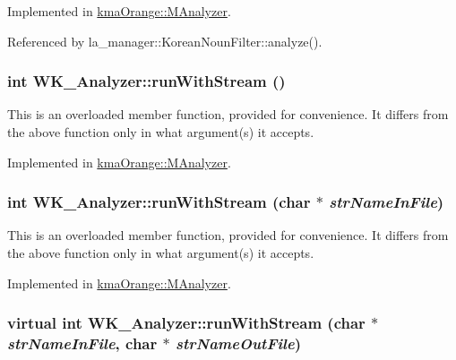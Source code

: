 Implemented in \hyperlink{classkmaOrange_1_1MAnalyzer_eff1127145ad2c8fb8e3e575d8ad1984}{kmaOrange::MAnalyzer}.

Referenced by la\_\-manager::KoreanNounFilter::analyze().\hypertarget{classWK__Analyzer_558f318419f56ffefaa2ac6027e2c12a}{
\subsubsection[{runWithStream}]{\setlength{\rightskip}{0pt plus 5cm}int WK\_\-Analyzer::runWithStream ()}}
\label{classWK__Analyzer_558f318419f56ffefaa2ac6027e2c12a}


This is an overloaded member function, provided for convenience. It differs from the above function only in what argument(s) it accepts. 

Implemented in \hyperlink{classkmaOrange_1_1MAnalyzer_906a4e70c747d3856b28e8c09fdb6a21}{kmaOrange::MAnalyzer}.\hypertarget{classWK__Analyzer_baf49aac1b32b7517c51c8cae3cf88b2}{
\subsubsection[{runWithStream}]{\setlength{\rightskip}{0pt plus 5cm}int WK\_\-Analyzer::runWithStream (char $\ast$ {\em strNameInFile})}}
\label{classWK__Analyzer_baf49aac1b32b7517c51c8cae3cf88b2}


This is an overloaded member function, provided for convenience. It differs from the above function only in what argument(s) it accepts. 

Implemented in \hyperlink{classkmaOrange_1_1MAnalyzer_6ca0018302292c83398c0c63d86616c3}{kmaOrange::MAnalyzer}.\hypertarget{classWK__Analyzer_a5e90adc6d240fcee91c41cf61bcfb16}{
\subsubsection[{runWithStream}]{\setlength{\rightskip}{0pt plus 5cm}virtual int WK\_\-Analyzer::runWithStream (char $\ast$ {\em strNameInFile}, \/  char $\ast$ {\em strNameOutFile})}}
\label{classWK__Analyzer_a5e90adc6d240fcee91c41cf61bcfb16}



